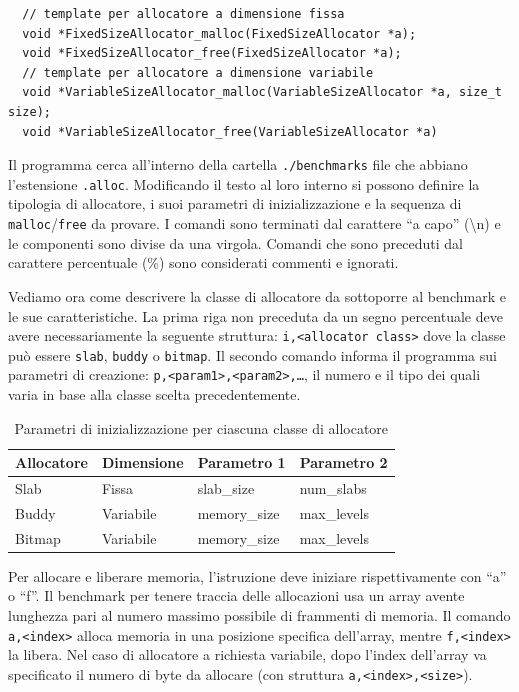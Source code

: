 \begin{lstlisting}
  // template per allocatore a dimensione fissa
  void *FixedSizeAllocator_malloc(FixedSizeAllocator *a);
  void *FixedSizeAllocator_free(FixedSizeAllocator *a);
  // template per allocatore a dimensione variabile
  void *VariableSizeAllocator_malloc(VariableSizeAllocator *a, size_t size);
  void *VariableSizeAllocator_free(VariableSizeAllocator *a)
\end{lstlisting}

Il programma cerca all’interno della cartella \texttt{./benchmarks} file che abbiano l’estensione \texttt{.alloc}. Modificando il testo al loro interno si possono definire la tipologia di allocatore, i suoi parametri di inizializzazione e la sequenza di \texttt{malloc}/\texttt{free} da provare. I comandi sono terminati dal carattere ``a capo'' (\textbackslash n) e le componenti sono divise da una virgola. Comandi che sono preceduti dal carattere percentuale (\%) sono considerati commenti e ignorati.

Vediamo ora come descrivere la classe di allocatore da sottoporre al benchmark e le sue caratteristiche. La prima riga non preceduta da un segno percentuale deve avere necessariamente la seguente struttura: \texttt{i,<allocator class>} dove la classe può essere \texttt{slab}, \texttt{buddy} o \texttt{bitmap}. Il secondo comando informa il programma sui parametri di creazione: \texttt{p,<param1>,<param2>,\ldots}, il numero e il tipo dei quali varia in base alla classe scelta precedentemente.

\begin{table}[H]
\centering
\begin{tabularx}{\textwidth}{|X|X|X|X|}
\hline
\textbf{Allocatore} & \textbf{Dimensione} & \textbf{Parametro 1} & \textbf{Parametro 2} \\
\hline
Slab    & Fissa     & slab\_size   & num\_slabs   \\
\hline
Buddy   & Variabile & memory\_size & max\_levels  \\
\hline
Bitmap  & Variabile & memory\_size & max\_levels  \\
\hline
\end{tabularx}
\caption{Parametri di inizializzazione per ciascuna classe di allocatore}
\end{table}

Per allocare e liberare memoria, l’istruzione deve iniziare rispettivamente con ``a'' o ``f''. Il benchmark per tenere traccia delle allocazioni usa un array avente lunghezza pari al numero massimo possibile di frammenti di memoria. Il comando \texttt{a,<index>} alloca memoria in una posizione specifica dell'array, mentre \texttt{f,<index>} la libera. Nel caso di allocatore a richiesta variabile, dopo l’index dell’array va specificato il numero di byte da allocare (con struttura \texttt{a,<index>,<size>}). 

